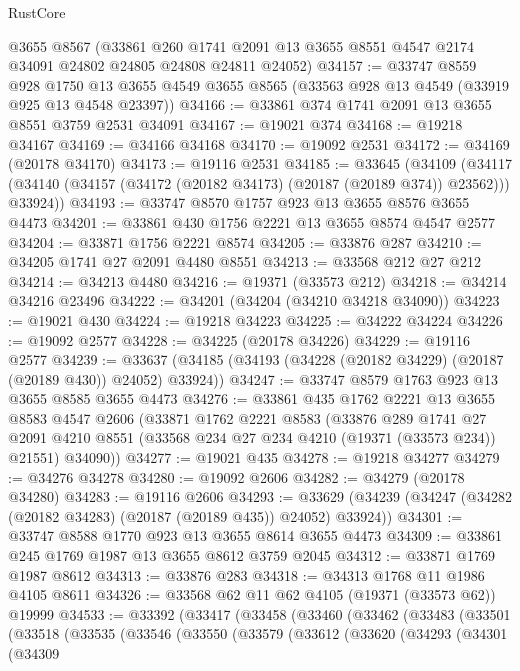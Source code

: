 \begin{lexlean}{RustCore}
\begin{coremodule}
    @3655
    @8567
    (@33861 @260 @1741 @2091 @13 @3655 @8551 @4547 @2174 @34091 @24802 @24805 @24808 @24811 @24052)
@34157 := @33747
    @8559
    @928
    @1750
    @13
    @3655
    @4549
    @3655
    @8565
    (@33563 @928 @13 @4549 (@33919 @925 @13 @4548 @23397))
@34166 := @33861 @374 @1741 @2091 @13 @3655 @8551 @3759 @2531 @34091
@34167 := @19021 @374
@34168 := @19218 @34167
@34169 := @34166 @34168
@34170 := @19092 @2531
@34172 := @34169 (@20178 @34170)
@34173 := @19116 @2531
@34185 := @33645
    (@34109
      (@34117 (@34140 (@34157 (@34172 (@20182 @34173) (@20187 (@20189 @374)) @23562))) @33924))
@34193 := @33747 @8570 @1757 @923 @13 @3655 @8576 @3655 @4473
@34201 := @33861 @430 @1756 @2221 @13 @3655 @8574 @4547 @2577
@34204 := @33871 @1756 @2221 @8574
@34205 := @33876 @287
@34210 := @34205 @1741 @27 @2091 @4480 @8551
@34213 := @33568 @212 @27 @212
@34214 := @34213 @4480
@34216 := @19371 (@33573 @212)
@34218 := @34214 @34216 @23496
@34222 := @34201 (@34204 (@34210 @34218 @34090))
@34223 := @19021 @430
@34224 := @19218 @34223
@34225 := @34222 @34224
@34226 := @19092 @2577
@34228 := @34225 (@20178 @34226)
@34229 := @19116 @2577
@34239 := @33637 (@34185 (@34193 (@34228 (@20182 @34229) (@20187 (@20189 @430)) @24052) @33924))
@34247 := @33747 @8579 @1763 @923 @13 @3655 @8585 @3655 @4473
@34276 := @33861
    @435
    @1762
    @2221
    @13
    @3655
    @8583
    @4547
    @2606
    (@33871
      @1762
      @2221
      @8583
      (@33876
        @289
        @1741
        @27
        @2091
        @4210
        @8551
        (@33568 @234 @27 @234 @4210 (@19371 (@33573 @234)) @21551)
        @34090))
@34277 := @19021 @435
@34278 := @19218 @34277
@34279 := @34276 @34278
@34280 := @19092 @2606
@34282 := @34279 (@20178 @34280)
@34283 := @19116 @2606
@34293 := @33629 (@34239 (@34247 (@34282 (@20182 @34283) (@20187 (@20189 @435)) @24052) @33924))
@34301 := @33747 @8588 @1770 @923 @13 @3655 @8614 @3655 @4473
@34309 := @33861 @245 @1769 @1987 @13 @3655 @8612 @3759 @2045
@34312 := @33871 @1769 @1987 @8612
@34313 := @33876 @283
@34318 := @34313 @1768 @11 @1986 @4105 @8611
@34326 := @33568 @62 @11 @62 @4105 (@19371 (@33573 @62)) @19999
@34533 := @33392
    (@33417
      (@33458
        (@33460
          (@33462
            (@33483
              (@33501
                (@33518
                  (@33535
                    (@33546
                      (@33550
                        (@33579
                          (@33612
                            (@33620
                              (@34293
                                (@34301
                                  (@34309

\end{coremodule}
\end{lexlean}
